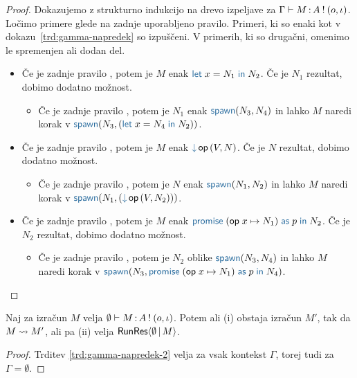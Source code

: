 \begin{proof}
	Dokazujemo z strukturno indukcijo na drevo izpeljave za $\Gamma \vdash M \mathinner{:} A \mathbin{!} (o, \iota)$.
	Ločimo primere glede na zadnje uporabljeno pravilo.
	Primeri, ki so enaki kot v dokazu~\ref{trd:gamma-napredek} so izpuščeni. V primerih, ki so drugačni, omenimo le spremenjen ali dodan del.
	
	\begin{itemize}
		\item Če je zadnje pravilo , potem je $M$ enak $\tmlet{x}{N_1}{N_2}$.
		Če je $N_1$ rezultat, dobimo dodatno možnost.
		\begin{itemize}
			\item Če je zadnje pravilo , potem je $N_1$ enak $\tmspawn{N_3}{N_4}$ in lahko $M$ naredi korak v $\tmspawn{N_3}{(\tmlet{x}{N_4}{N_2})}$.
		\end{itemize}
		
		\item Če je zadnje pravilo , potem je $M$ enak $\tmopin{op}{V}{N}$.
		Če je $N$ rezultat, dobimo dodatno možnost.
		\begin{itemize}
			\item Če je zadnje pravilo , potem je $N$ enak $\tmspawn{N_1}{N_2}$ in lahko $M$ naredi korak v $\tmspawn{N_1}{(\tmopin{op}{V}{N_2})}$.
		\end{itemize}
		
		
		\item Če je zadnje pravilo , potem je $M$ enak $\tmwith{op}{x}{N_1}{p}{N_2}$.
		Če je $N_2$ rezultat, dobimo dodatno možnost.
		\begin{itemize}
			\item Če je zadnje pravilo , potem je $N_2$ oblike $\tmspawn{N_3}{N_4}$ in lahko $M$ naredi korak v $\tmspawn{N_3}{\tmwith{op}{x}{N_1}{p}{N_4}}$.
		\end{itemize}		
	\end{itemize}	
\end{proof}


\begin{posledica}[o napredku]\label{pos:prazen-napredek-2}
	Naj za izračun $M$ velja $\emptyset \vdash M \mathinner{:} A \mathbin{!} (o, \iota)$. Potem ali (i) obstaja izračun $M'$, tak da $M \leadsto M'$, ali pa (ii) velja $\mathsf{RunRes}\langle\emptyset \,\vert\, M\rangle$.
\end{posledica}

\begin{proof}
	Trditev \ref{trd:gamma-napredek-2} velja za vsak kontekst $\Gamma$, torej tudi za $\Gamma = \emptyset$.
\end{proof}


